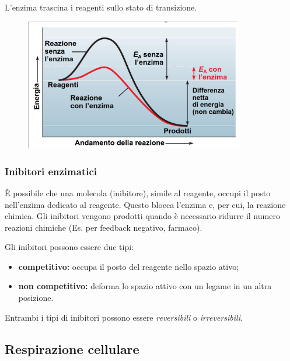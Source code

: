 \documentclass[a4paper]{article}
\begin{document}
L'enzima trascina i reagenti sullo stato di transizione.

\begin{figure}[ht!]
    \centering
    \includegraphics[width=0.85\textwidth]{./energy_reaction.png}
\end{figure}

\pagebreak

\subsubsection{Inibitori enzimatici}

È possibile che una molecola (inibitore), simile al reagente, occupi il 
posto nell'enzima dedicato al reagente. Questo blocca l'enzima e, per cui, la reazione chimica.
Gli inibitori vengono prodotti quando è necessario ridurre il numero reazioni chimiche
(Es. per feedback negativo, farmaco).

Gli inibitori possono essere due tipi:
\begin{itemize}
    \item \textbf{competitivo:} occupa il posto del reagente nello spazio ativo;
    \item \textbf{non competitivo:} deforma lo spazio attivo con un legame in un altra posizione.
\end{itemize}

Entrambi i tipi di inibitori possono essere \textit{reversibili} o \textit{irreversibili}.

\subsection{Respirazione cellulare}
\end{document}
